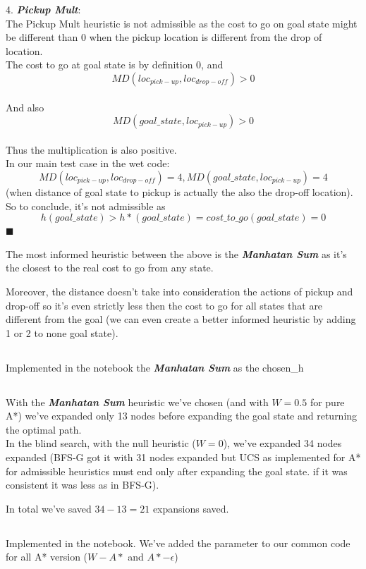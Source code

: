 \documentclass[12pt]{article}
\newcommand{\qed}{\hfill$\blacksquare$}
\begin{document}
4. {\textit{\textbf{Pickup Mult}}}:\\
The Pickup Mult heuristic is not admissible as the cost to go on goal state might be different than 0 when the pickup location is different from the drop of location.\\
The cost to go at goal state is by definition 0, and $$MD(loc_{pick-up},loc_{drop-off}) > 0$$\\
And also
$$MD(goal\_state,loc_{pick-up}) > 0$$\\
Thus the multiplication is also positive.\\
In our main test case in the wet code:
$$MD(loc_{pick-up},loc_{drop-off})=4, MD(goal\_state,loc_{pick-up})=4$$
(when distance of goal state to pickup is actually the also the drop-off location).
So to conclude, it's not admissible as $$h(goal\_state) > h*(goal\_state) = cost\_to\_go(goal\_state) = 0$$
\qed

The most informed heuristic between the above is the {\textit{\textbf{Manhatan Sum}}} as it's the closest to the real cost to go from any state.

Moreover, the distance doesn't take into consideration the actions of pickup and drop-off so it's even strictly less then the cost to go for all states that are different from the goal (we can even create a better informed heuristic by adding 1 or 2 to none goal state).

\subsection{}

Implemented in the notebook the {\textit{\textbf{Manhatan Sum}}} as the chosen\_h

\subsection{}
With the {\textit{\textbf{Manhatan Sum}}} heuristic we've chosen (and with $W=0.5$ for pure A*) we've expanded only 13 nodes before expanding the goal state and returning the optimal path.\\
In the blind search, with the null heuristic ($W=0$), we've expanded 34 nodes  expanded (BFS-G got it with 31 nodes expanded but UCS as implemented for A* for admissible heuristics must end only after expanding the goal state. if it was consistent it was less as in BFS-G).

In total we've saved $34-13=21$ expansions saved.

\subsection{}
Implemented in the notebook. We've added the parameter to our common code for all A* version ($W-A*$ and $A*-\epsilon$)
\end{document}
